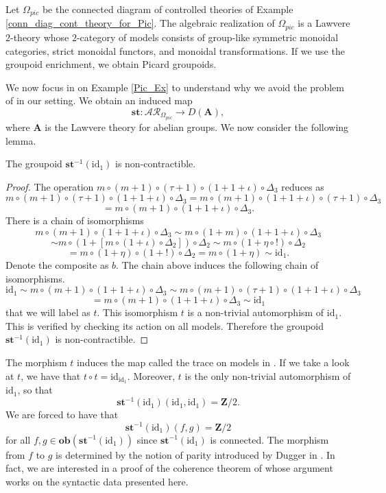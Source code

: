 \documentclass{tac}
\begin{document}
\begin{example}\label{Pic_Ex}
Let $\Omega_{pic}$ be the connected diagram of controlled theories of Example \ref{conn_diag_cont_theory_for_Pic}. The algebraic realization of $\Omega_{pic}$ is a Lawvere $2$-theory whose $2$-category of models consists of group-like symmetric monoidal categories, strict monoidal functors, and monoidal transformations. If we use the groupoid enrichment, we obtain Picard groupoids.
\end{example}

We now focus in on Example \ref{Pic_Ex} to understand why we avoid the problem of \cite{SchwanzlVogt1989} in our setting. We obtain an induced map 
\[
\mathbf{st}:\mathcal{AR}_{\Omega_{pic}}\to D(\mathbf{A}),
\]
where $\mathbf{A}$ is the Lawvere theory for abelian groups.
We now consider the following lemma.

\begin{proposition}\label{non_contract_lemma}
The groupoid $\mathbf{st}^{-1}(\text{id}_1)$ is non-contractible.
\end{proposition}

\begin{proof}
    The operation $m\circ (m+1)\circ (\tau+1)\circ(1+1+\iota)\circ\Delta_3$ reduces as
    \[
    m\circ (m+1)\circ (\tau+1)\circ(1+1+\iota)\circ\Delta_3=m\circ (m+1)\circ (1+1+\iota)\circ(\tau+1)\circ\Delta_3
    \]
    \[
    =m\circ (m+1)\circ (1+1+\iota)\circ\Delta_3.
    \]
    There is a chain of isomorphisms
    \[
    m\circ (m+1)\circ (1+1+\iota)\circ\Delta_3\sim m\circ (1+m)\circ (1+1+\iota)\circ\Delta_3
    \]
    \[
    \sim m\circ (1+[m\circ (1+\iota)\circ\Delta_2])\circ\Delta_2\sim m\circ(1+\eta\circ !)\circ\Delta_2
    \]
    \[
    = m\circ (1+\eta)\circ (1+!)\circ\Delta_2=m\circ(1+\eta)\sim\text{id}_1.
    \]
    Denote the composite as $b$. The chain above induces the following chain of isomorphisms.
    \[
    \text{id}_1\sim  m\circ (m+1)\circ (1+1+\iota)\circ\Delta_3\sim  m\circ (m+1)\circ(\tau+1)\circ (1+1+\iota)\circ\Delta_3
    \]
    \[
    =m\circ (m+1)\circ (1+1+\iota)\circ\Delta_3\sim\text{id}_1
    \]
    that we will label as $t$. This isomorphism $t$ is a non-trivial automorphism of $\text{id}_1$. This is verified by checking its action on all models. Therefore the groupoid $\mathbf{st}^{-1}(\text{id}_1)$ is non-contractible. 
\end{proof}
The morphism $t$ induces the map called the trace on models in \cite{Dugg,JoyalStreetVerity1996}. If we take a look at $t$, we have that $t\circ t=\text{id}_{\text{id}_1}$. Moreover, $t$ is the only non-trivial automorphism of $\text{id}_1$, so that
\[
\mathbf{st}^{-1}(\text{id}_1)(\text{id}_1,\text{id}_1)=\mathbf{Z}/2.
\]
We are forced to have that 
\[
\mathbf{st}^{-1}(\text{id}_1)(f,g)=\mathbf{Z}/2
\]
for all $f,g\in \mathbf{ob}(\mathbf{st}^{-1}(\text{id}_1))$ since $\mathbf{st}^{-1}(\text{id}_1)$ is connected. The morphism from $f$ to $g$ is determined by the notion of parity introduced by Dugger in \cite{Dugg}. In fact, we are interested in a proof of the coherence theorem of \cite{Dugg} whose argument works on the syntactic data presented here.
\end{document}
